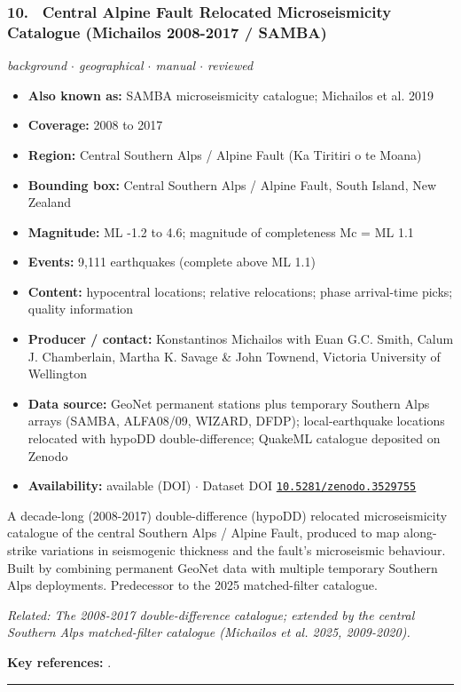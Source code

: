 \documentclass[10pt,a4paper]{article}
\newcommand{\catentryrule}{\par\vspace{3pt}\noindent\textcolor{rulegrey}{\rule{\linewidth}{0.3pt}}\par\vspace{5pt}}
\newcommand{\kv}[2]{\item \textbf{#1:} #2}
\begin{document}
\subsubsection*{\hypertarget{c:10}{10.}~ Central Alpine Fault Relocated Microseismicity Catalogue (Michailos 2008-2017 / SAMBA)}
{\small\itshape background $\cdot$ geographical $\cdot$ manual $\cdot$ reviewed}\par\vspace{2pt}
\begin{itemize}[leftmargin=1.3em,itemsep=0.6pt,topsep=1pt,parsep=0pt]
\kv{Also known as}{SAMBA microseismicity catalogue; Michailos et al. 2019}
\kv{Coverage}{2008 to 2017}
\kv{Region}{Central Southern Alps / Alpine Fault (Ka Tiritiri o te Moana)}
\kv{Bounding box}{Central Southern Alps / Alpine Fault, South Island, New Zealand}
\kv{Magnitude}{ML -1.2 to 4.6; magnitude of completeness Mc = ML 1.1}
\kv{Events}{9,111 earthquakes (complete above ML 1.1)}
\kv{Content}{hypocentral locations; relative relocations; phase arrival-time picks; quality information}
\kv{Producer / contact}{Konstantinos Michailos with Euan G.C. Smith, Calum J. Chamberlain, Martha K. Savage \& John Townend, Victoria University of Wellington}
\kv{Data source}{GeoNet permanent stations plus temporary Southern Alps arrays (SAMBA, ALFA08/09, WIZARD, DFDP); local-earthquake locations relocated with hypoDD double-difference; QuakeML catalogue deposited on Zenodo}
\kv{Availability}{available (DOI) $\cdot$ Dataset DOI \href{https://doi.org/10.5281/zenodo.3529755}{\nolinkurl{10.5281/zenodo.3529755}}}
\end{itemize}
\par\vspace{2pt}A decade-long (2008-2017) double-difference (hypoDD) relocated microseismicity catalogue of the central Southern Alps / Alpine Fault, produced to map along-strike variations in seismogenic thickness and the fault's microseismic behaviour. Built by combining permanent GeoNet data with multiple temporary Southern Alps deployments. Predecessor to the 2025 matched-filter catalogue.
\par{\small\itshape Related: The 2008-2017 double-difference catalogue; extended by the central Southern Alps matched-filter catalogue (Michailos et al. 2025, 2009-2020).}
\par\vspace{2pt}\textbf{Key references:} \cite{Michailos2019,Michailos2019a}.
\catentryrule
\end{document}
